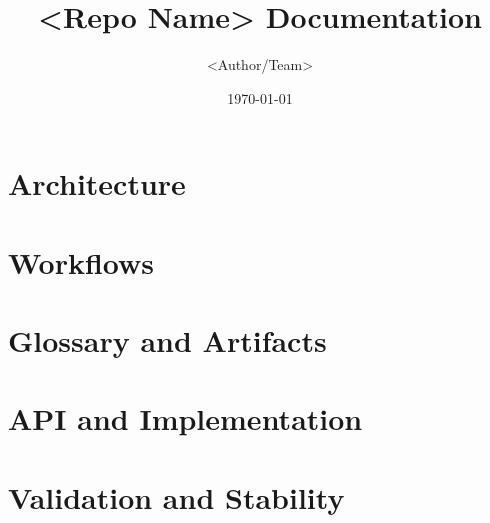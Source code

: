 \documentclass{book}
\title{<Repo Name> Documentation}
\author{<Author/Team>}
\date{\today}
\begin{document}
\maketitle
\tableofcontents

\chapter{Architecture}


\chapter{Workflows}


\chapter{Glossary and Artifacts}




\chapter{API and Implementation}




\chapter{Validation and Stability}



\end{document}
